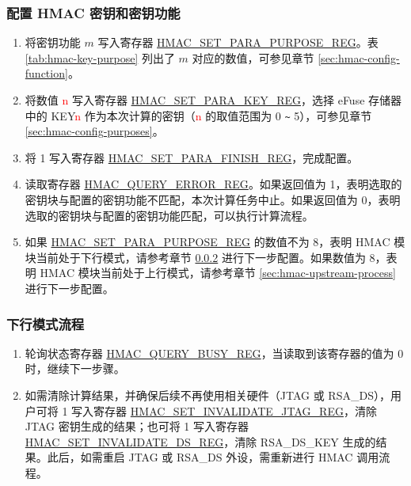 \documentclass[main\_\_CN.tex]{subfiles}
\begin{document}
\subsubsection{配置 HMAC 密钥和密钥功能}
        \begin{enumerate}
            \item 将密钥功能 \begin{math}m\end{math} 写入寄存器 \hyperref[regdesc:HMACSETPARAPURPOSEREG]{HMAC\_SET\_PARA\_PURPOSE\_REG}。表 \ref{tab:hmac-key-purpose} 列出了 \begin{math}m\end{math} 对应的数值，可参见章节 \ref{sec:hmac-config-function}。
            \item 将数值 \textcolor{red}{n} 写入寄存器 \hyperref[regdesc:HMACSETPARAKEYREG]{HMAC\_SET\_PARA\_KEY\_REG}，选择 eFuse 存储器中的 KEY\textcolor{red}{n} 作为本次计算的密钥（\textcolor{red}{n} 的取值范围为 0 \verb+~+ 5），可参见章节 \ref{sec:hmac-config-purposes}。
            \item 将 1 写入寄存器 \hyperref[regdesc:HMACSETPARAFINISHREG]{HMAC\_SET\_PARA\_FINISH\_REG}，完成配置。
            \item 读取寄存器 \hyperref[regdesc:HMACQUERYERRORREG]{HMAC\_QUERY\_ERROR\_REG}。如果返回值为 1，表明选取的密钥块与配置的密钥功能不匹配，本次计算任务中止。如果返回值为 0，表明选取的密钥块与配置的密钥功能匹配，可以执行计算流程。
            \item 如果 \hyperref[regdesc:HMACSETPARAPURPOSEREG]{HMAC\_SET\_PARA\_PURPOSE\_REG} 的数值不为 8，表明 HMAC 模块当前处于下行模式，请参考章节 \ref{sec:hmac-downstream-process} 进行下一步配置。如果数值为 8，表明 HMAC 模块当前处于上行模式，请参考章节 \ref{sec:hmac-upstream-process} 进行下一步配置。
        \end{enumerate}

\subsubsection{下行模式流程}
\label{sec:hmac-downstream-process}
        \begin{enumerate}
            \item 轮询状态寄存器 \hyperref[regdesc:HMACQUERYBUSYREG]{HMAC\_QUERY\_BUSY\_REG}，当读取到该寄存器的值为 0 时，继续下一步骤。
            \item 如需清除计算结果，并确保后续不再使用相关硬件（JTAG 或 RSA\_DS），用户可将 1 写入寄存器 \hyperref[regdesc:HMACSETINVALIDATEJTAGREG]{HMAC\_SET\_INVALIDATE\_JTAG\_REG}，清除 JTAG 密钥生成的结果；也可将 1 写入寄存器 \hyperref[regdesc:HMACSETINVALIDATEDSREG]{HMAC\_SET\_INVALIDATE\_DS\_REG}，清除 RSA\_DS\_KEY 生成的结果。此后，如需重启 JTAG 或 RSA\_DS 外设，需重新进行 HMAC 调用流程。
        \end{enumerate}
\end{document}
